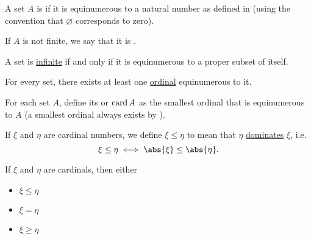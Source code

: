 \begin{definition}\label{def:finite_set}\mcite\cite[133]{Enderton1977Sets}
  A set \( A \) is  if it is equinumerous to a natural number as defined in  (using the convention that \( \varnothing \) corresponds to zero).

  If \( A \) is not finite, we say that it is .
\end{definition}

\begin{proposition}\label{thm:infinite_set_iff_equinumerous_to_proper_subset}\mcite\cite[cor. 6D]{Enderton1977Sets}
  A set is \hyperref[def:finite_set]{infinite} if and only if it is equinumerous to a proper subset of itself.
\end{proposition}

\medskip

\begin{theorem}\label{thm:equinumerous_ordinal_existence}\mcite\cite[197]{Enderton1977Sets}
  For every set, there exists at least one \hyperref[def:ordinal]{ordinal} equinumerous to it.
\end{theorem}

\medskip

\begin{definition}\label{def:cardinal}\mcite\cite[197]{Enderton1977Sets}
  For each set \( A \), define its  or  \( \operatorname{card} A \) as the smallest ordinal that is equinumerous to \( A \) (a smallest ordinal always exists by ).

  If \( \xi \) and \( \eta \) are cardinal numbers, we define \( \xi \leq \eta \) to mean that \( \eta \) \hyperref[def:set_domination]{dominates} \( \xi \), i.e.
  \begin{equation*}
    \xi \leq \eta \iff \abs{\xi} \leq \abs{\eta}.
  \end{equation*}
\end{definition}

\begin{theorem}\label{thm:cardinal_trichotomy}\mcite\cite[thm. 6M(5)]{Enderton1977Sets}
  If \( \xi \) and \( \eta \) are cardinals, then either
  \begin{itemize}
    \item \( \xi \leq \eta \)
    \item \( \xi = \eta \)
    \item \( \xi \geq \eta \)
  \end{itemize}
\end{theorem}


